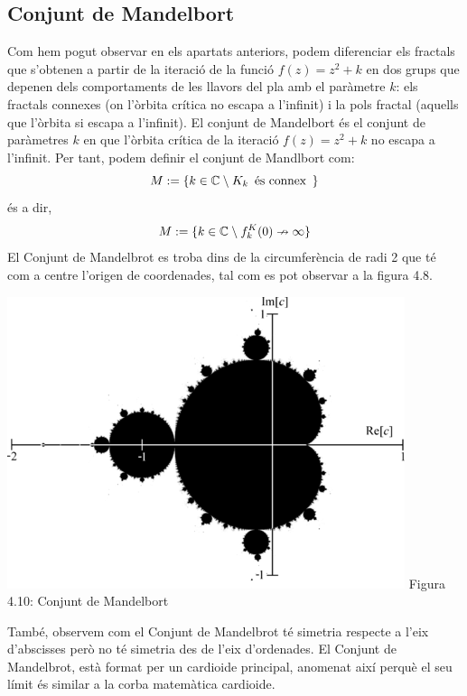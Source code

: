 \documentclass[12pt]{report}
\begin{document}
\subsection{Conjunt de Mandelbort}
Com hem pogut observar en els apartats anteriors, podem diferenciar els fractals que s'obtenen a partir de la iteració de la funció $f(z)=z^2+k$ en dos grups que depenen dels comportaments de les llavors del pla amb el paràmetre $k$: els fractals connexes (on l'òrbita crítica no escapa a l'infinit) i la pols fractal (aquells que l'òrbita si escapa a l'infinit).
\newline
El conjunt de Mandelbort és el conjunt de paràmetres $k$ en que l'òrbita crítica de la iteració $f(z)=z^2+k$ no escapa a l'infinit.
\newline
Per tant, podem definir el conjunt de Mandlbort com:
$$M := \{ k \in \mathbb{C} \hspace{0.25em} \backslash
\hspace{0.25em} K_k \hspace{0.5em} \text{és connex} \hspace{0.5em}\}$$
és a dir,
$$M := \{ k\in \mathbb{C} \hspace{0.25em} \backslash \hspace{0.25em} f^K_k(0)\nrightarrow \infty\}$$
 El Conjunt de Mandelbrot es troba dins de la circumferència de radi 2 que té com a centre l'origen de coordenades, tal com es pot observar a la figura 4.8.
 \begin{center}
     \includegraphics[width=0.5 \textwidth]{mandelbortCr2.png}
     \newline
     Figura 4.10: Conjunt de Mandelbort
 \end{center}
També, observem com el Conjunt de Mandelbrot té simetria respecte a l'eix d'abscisses però no té simetria des de l'eix d'ordenades.
\newline
El Conjunt de Mandelbrot, està format per un cardioide principal, anomenat així perquè el seu límit és similar a la corba matemàtica cardioide.
\newline
\end{document}
